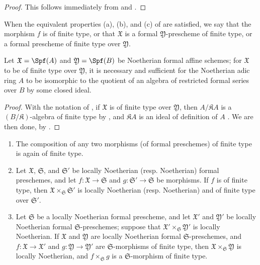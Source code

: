 \begin{proof}
This follows immediately from  and .
\end{proof}

\begin{definition}[10.13.3]
\label{I.10.13.3}
When the equivalent properties (a), (b), and (c) of  are satisfied, we say that the morphism $f$ is of finite type, or that $\mathfrak{X}$ is a formal $\mathfrak{Y}$-prescheme of finite type, or a formal prescheme of finite type over $\mathfrak{Y}$.
\end{definition}

\begin{corollary}[10.13.4]
\label{I.10.13.4}
Let $\mathfrak{X}=\Spf(A)$ and $\mathfrak{Y}=\Spf(B)$ be Noetherian formal affine schemes;
for $\mathfrak{X}$ to be of finite type over $\mathfrak{Y}$, it is necessary and sufficient for the Noetherian adic ring $A$ to be isomorphic to the quotient of an algebra of restricted formal series over $B$ by some closed ideal.
\end{corollary}

\begin{proof}
With the notation of , if $\mathfrak{X}$ is of finite type over $\mathfrak{Y}$, then $A/\mathfrak{K}A$ is a $(B/\mathfrak{K})$-algebra of finite type by , and $\mathfrak{K}A$ is an ideal of definition of $A$ .
We are then done, by .
\end{proof}

\begin{proposition}[10.13.5]
\label{I.10.13.5}
\medskip\noindent
\begin{enumerate}
  \item[\rm{(i)}] The composition of any two morphisms (of formal preschemes) of finite type is again of finite type.
  \item[\rm{(ii)}] Let $\mathfrak{X}$, $\mathfrak{S}$, and $\mathfrak{S}'$ be locally Noetherian (resp. Noetherian) formal preschemes, and let $f:\mathfrak{X}\to\mathfrak{S}$ and $g:\mathfrak{S}'\to\mathfrak{S}$ be morphisms.
    If $f$ is of finite type, then $\mathfrak{X}\times_\mathfrak{S}\mathfrak{S}'$ is locally Noetherian (resp. Noetherian) and of finite type over $\mathfrak{S}'$.
  \item[\rm{(iii)}] Let $\mathfrak{S}$ be a locally Noetherian formal prescheme, and let $\mathfrak{X}'$ and $\mathfrak{Y}'$ be locally Noetherian formal $\mathfrak{S}$-preschemes; suppose that $\mathfrak{X}'\times_\mathfrak{S}\mathfrak{Y}'$ is locally Noetherian.
    If $\mathfrak{X}$ and $\mathfrak{Y}$ are locally Noetherian formal $\mathfrak{S}$-preschemes, and $f:\mathfrak{X}\to\mathfrak{X}'$ and $g:\mathfrak{Y}\to\mathfrak{Y}'$ are $\mathfrak{S}$-morphisms of finite type, then $\mathfrak{X}\times_\mathfrak{S}\mathfrak{Y}$ is locally Noetherian, and $f\times_\mathfrak{S}g$ is a $\mathfrak{S}$-morphism of finite type.
\end{enumerate}
\end{proposition}

